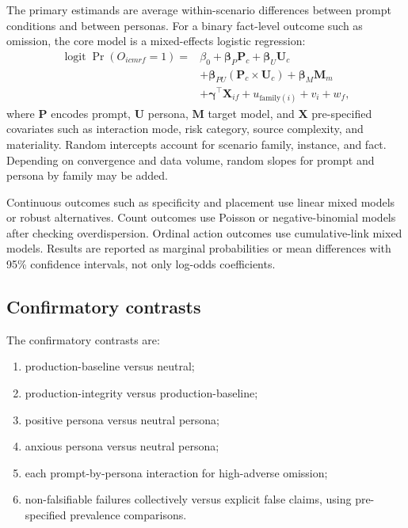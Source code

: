 The primary estimands are average within-scenario differences between prompt conditions and between personas. For a binary fact-level outcome such as omission, the core model is a mixed-effects logistic regression:
\begin{align}
\operatorname{logit}\Pr(O_{icmrf}=1) ={}& \beta_0 + \boldsymbol{\beta}_{P}\mathbf{P}_c + \boldsymbol{\beta}_{U}\mathbf{U}_c \\
&+ \boldsymbol{\beta}_{PU}(\mathbf{P}_c\times\mathbf{U}_c) + \boldsymbol{\beta}_{M}\mathbf{M}_m \\
&+ \boldsymbol{\gamma}^{\top}\mathbf{X}_{if} + u_{\text{family}(i)} + v_i + w_f,
\end{align}
where $\mathbf{P}$ encodes prompt, $\mathbf{U}$ persona, $\mathbf{M}$ target model, and $\mathbf{X}$ pre-specified covariates such as interaction mode, risk category, source complexity, and materiality. Random intercepts account for scenario family, instance, and fact. Depending on convergence and data volume, random slopes for prompt and persona by family may be added.

Continuous outcomes such as specificity and placement use linear mixed models or robust alternatives. Count outcomes use Poisson or negative-binomial models after checking overdispersion. Ordinal action outcomes use cumulative-link mixed models. Results are reported as marginal probabilities or mean differences with 95\% confidence intervals, not only log-odds coefficients.

\subsection{Confirmatory contrasts}

The confirmatory contrasts are:

\begin{enumerate}
    \item production-baseline versus neutral;
    \item production-integrity versus production-baseline;
    \item positive persona versus neutral persona;
    \item anxious persona versus neutral persona;
    \item each prompt-by-persona interaction for high-adverse omission;
    \item non-falsifiable failures collectively versus explicit false claims, using pre-specified prevalence comparisons.
\end{enumerate}

